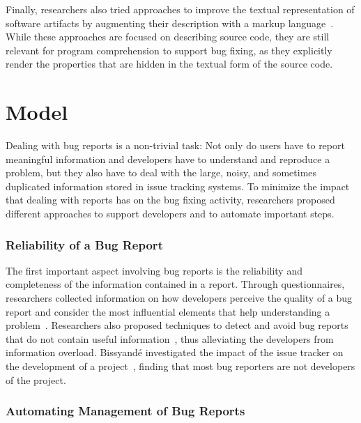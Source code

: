 Finally, researchers also tried approaches to improve the textual representation of software artifacts by augmenting their description with a markup language~\cite{Badr2000,Male2002a}.
While these approaches are focused on describing source code, they are still relevant for program comprehension to support bug fixing, as they explicitly render the properties that are hidden in the textual form of the source code.



\section{Model} \label{sec:related-model}

Dealing with bug reports is a non-trivial task: Not only do users have to report meaningful information and developers have to understand and reproduce a problem, but they also have to deal with the large, noisy, and sometimes duplicated  information stored in issue tracking systems.
To minimize the impact that dealing with reports has on the bug fixing activity, researchers proposed different approaches to support developers and to automate important steps.


\subsubsection{Reliability of a Bug Report}

The first important aspect involving bug reports is the reliability and completeness of the information contained in a report.
Through questionnaires, researchers collected information on how developers perceive the quality of a bug report and consider the most influential elements that help understanding a problem~\cite{Zimm2010a,Bett2007,Schr2010a}.
Researchers also proposed techniques to detect and avoid bug reports that do not contain useful information~\cite{Sun2011}, thus alleviating the developers from information overload.
Bissyand\'e \etal investigated the impact of the issue tracker on the development of a project~\cite{Biss2013b}, finding that most bug reporters are not developers of the project.


\subsubsection{Automating Management of Bug Reports}

